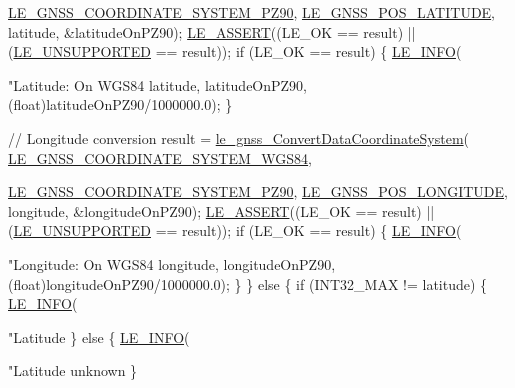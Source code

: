 \begin{DoxyCodeInclude}
{{{{{{{{{{{      \hyperlink{le__gnss__interface_8h_a8d401bb325c46681677bd273433565beab88cd62cd5cb91159ea892a8f3444946}{LE\_GNSS\_COORDINATE\_SYSTEM\_PZ90},
                                                     \hyperlink{le__gnss__interface_8h_afd57bfce3570198fbcf0a98d81dab1c9a92d752c094ebf9bf61a56873e3077a54}{LE\_GNSS\_POS\_LATITUDE},
                                                     latitude,
                                                     &latitudeOnPZ90);
        \hyperlink{le__log_8h_ac0dbbef91dc0fed449d0092ff0557b39}{LE\_ASSERT}((LE\_OK == result) || (\hyperlink{le__basics_8h_a1cca095ed6ebab24b57a636382a6c86ca5377262702e8434207b03533259e0c5f}{LE\_UNSUPPORTED} == result));
        \textcolor{keywordflow}{if} (LE\_OK == result)
        \{
            \hyperlink{le__log_8h_a23e6d206faa64f612045d688cdde5808}{LE\_INFO}(\textcolor{stringliteral}{"Latitude: On WGS84 %
                    latitude,
                    latitudeOnPZ90,
                    (\textcolor{keywordtype}{float})latitudeOnPZ90/1000000.0);
        \}

        \textcolor{comment}{// Longitude conversion}
        result = \hyperlink{le__gnss__interface_8h_af32fd94e35e4df94b65c84740c5dbf42}{le\_gnss\_ConvertDataCoordinateSystem}(
      \hyperlink{le__gnss__interface_8h_a8d401bb325c46681677bd273433565bea6211648c7f9b9c1e99c533d29033a618}{LE\_GNSS\_COORDINATE\_SYSTEM\_WGS84},
                                                     
      \hyperlink{le__gnss__interface_8h_a8d401bb325c46681677bd273433565beab88cd62cd5cb91159ea892a8f3444946}{LE\_GNSS\_COORDINATE\_SYSTEM\_PZ90},
                                                     \hyperlink{le__gnss__interface_8h_afd57bfce3570198fbcf0a98d81dab1c9a395dee3a1d2445dbfbc2c533fe5173e3}{LE\_GNSS\_POS\_LONGITUDE},
                                                     longitude,
                                                     &longitudeOnPZ90);
        \hyperlink{le__log_8h_ac0dbbef91dc0fed449d0092ff0557b39}{LE\_ASSERT}((LE\_OK == result) || (\hyperlink{le__basics_8h_a1cca095ed6ebab24b57a636382a6c86ca5377262702e8434207b03533259e0c5f}{LE\_UNSUPPORTED} == result));
        \textcolor{keywordflow}{if} (LE\_OK == result)
        \{
            \hyperlink{le__log_8h_a23e6d206faa64f612045d688cdde5808}{LE\_INFO}(\textcolor{stringliteral}{"Longitude: On WGS84 %
                    longitude,
                    longitudeOnPZ90,
                    (\textcolor{keywordtype}{float})longitudeOnPZ90/1000000.0);
        \}
    \}
    \textcolor{keywordflow}{else}
    \{
        \textcolor{keywordflow}{if} (INT32\_MAX != latitude)
        \{
            \hyperlink{le__log_8h_a23e6d206faa64f612045d688cdde5808}{LE\_INFO}(\textcolor{stringliteral}{"Latitude %
        \}
        \textcolor{keywordflow}{else}
        \{
            \hyperlink{le__log_8h_a23e6d206faa64f612045d688cdde5808}{LE\_INFO}(\textcolor{stringliteral}{"Latitude unknown %
        \}

}}}}}}}}}}}}}}}
\end{DoxyCodeInclude}
